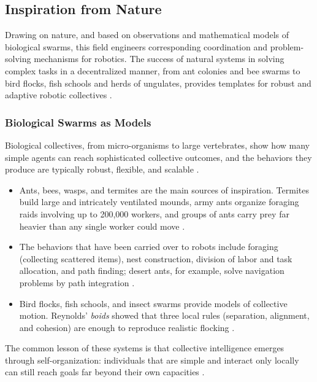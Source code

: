 \subsection{Inspiration from Nature}

Drawing on nature, and based on observations and mathematical models of
biological swarms, this field engineers corresponding coordination and
problem-solving mechanisms for robotics. The success of natural systems in
solving complex tasks in a decentralized manner, from ant colonies and bee
swarms to bird flocks, fish schools and herds of ungulates, provides templates
for robust and adaptive robotic collectives \cite{tan2013research}.

\subsubsection{Biological Swarms as Models}

Biological collectives, from micro-organisms to large vertebrates, show how many
simple agents can reach sophisticated collective outcomes, and the behaviors they
produce are typically robust, flexible, and scalable \cite{dias2021swarm,bonabeau1999swarm}.
\begin{itemize}
  \item {} Ants, bees, wasps, and termites are the main sources
        of inspiration. Termites build large and intricately ventilated mounds,
        army ants organize foraging raids involving up to 200,000
        workers, and groups of ants carry prey far heavier than any single
        worker could move \cite{bonabeau1999swarm,garnier2007biological}.
  \item {} The behaviors that have been carried
        over to robots include foraging (collecting scattered items), nest
        construction, division of labor and task allocation, and path finding;
        desert ants, for example, solve navigation problems by path integration
        \cite{hamann2018swarm,tan2013research}.
  \item {} Bird flocks, fish schools, and insect swarms
        provide models of collective motion. Reynolds' \emph{boids} showed that
        three local rules (separation, alignment, and cohesion) are enough to
        reproduce realistic flocking \cite{reynolds1987flocks}.
\end{itemize}
The common lesson of these systems is that collective intelligence emerges
through self-organization: individuals that are simple and interact only
locally can still reach goals far beyond their own capacities
\cite{garnier2007biological}.

